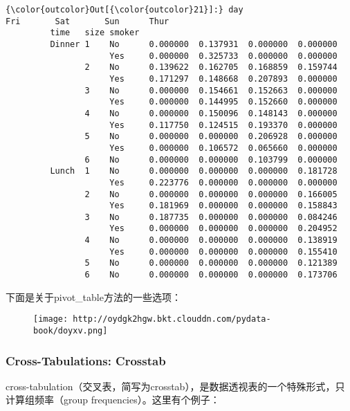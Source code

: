 \documentclass[11pt]{article}
\makeatletter
\def\maxwidth{\ifdim\Gin@nat@width>\linewidth\linewidth
    \else\Gin@nat@width\fi}
\let\Oldincludegraphics\includegraphics
\renewcommand{\includegraphics}[1]{\Oldincludegraphics[width=.8\maxwidth]{#1}}
\makeatother
\begin{document}
\begin{Verbatim}[commandchars=\\\{\}]
{\color{outcolor}Out[{\color{outcolor}21}]:} day                      Fri       Sat       Sun      Thur
         time   size smoker                                        
         Dinner 1    No      0.000000  0.137931  0.000000  0.000000
                     Yes     0.000000  0.325733  0.000000  0.000000
                2    No      0.139622  0.162705  0.168859  0.159744
                     Yes     0.171297  0.148668  0.207893  0.000000
                3    No      0.000000  0.154661  0.152663  0.000000
                     Yes     0.000000  0.144995  0.152660  0.000000
                4    No      0.000000  0.150096  0.148143  0.000000
                     Yes     0.117750  0.124515  0.193370  0.000000
                5    No      0.000000  0.000000  0.206928  0.000000
                     Yes     0.000000  0.106572  0.065660  0.000000
                6    No      0.000000  0.000000  0.103799  0.000000
         Lunch  1    No      0.000000  0.000000  0.000000  0.181728
                     Yes     0.223776  0.000000  0.000000  0.000000
                2    No      0.000000  0.000000  0.000000  0.166005
                     Yes     0.181969  0.000000  0.000000  0.158843
                3    No      0.187735  0.000000  0.000000  0.084246
                     Yes     0.000000  0.000000  0.000000  0.204952
                4    No      0.000000  0.000000  0.000000  0.138919
                     Yes     0.000000  0.000000  0.000000  0.155410
                5    No      0.000000  0.000000  0.000000  0.121389
                6    No      0.000000  0.000000  0.000000  0.173706
\end{Verbatim}
            
    下面是关于pivot\_table方法的一些选项：

\begin{figure}
\centering
\texttt{[image: http://oydgk2hgw.bkt.clouddn.com/pydata-book/doyxv.png]}
\caption{}
\end{figure}

    \subsubsection{Cross-Tabulations:
Crosstab}\label{cross-tabulations-crosstab}

cross-tabulation（交叉表，简写为crosstab），是数据透视表的一个特殊形式，只计算组频率（group
frequencies）。这里有个例子：
\end{document}
